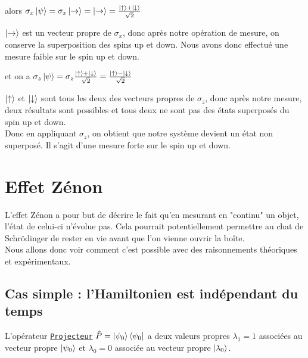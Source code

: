 \documentclass[11pt]{article}
\begin{document}
\begin{tabbing}
    alors \( \sigma_x \ket{\psi} = \sigma_x \ket{\rightarrow} = \ket{\rightarrow} = \frac{\ket{\uparrow} + \ket{\downarrow}}{\sqrt{2}} \)
\end{tabbing}
\( \ket{\rightarrow} \) est un vecteur propre de \( \sigma_x \), donc après notre opération de mesure, on conserve la superposition des spins up et down. Nous avons donc effectué une mesure faible sur le spin up et down.
\begin{tabbing}
    et on a \( \sigma_z \ket{\psi} = \sigma_z \frac{\ket{\uparrow} + \ket{\downarrow}}{\sqrt{2}} = \frac{\ket{\uparrow} - \ket{\downarrow}}{\sqrt{2}} \) 
\end{tabbing}

\( \ket{\uparrow} \) et \( \ket{\downarrow} \) sont tous les deux des vecteurs propres de \( \sigma_z \), donc après notre mesure, deux résultats sont possibles et tous deux ne sont pas des états superposés du spin up et down.
\\Donc en appliquant \( \sigma_z \), on obtient que notre système devient un état non superposé. Il s'agit d'une mesure forte sur le spin up et down.


\newpage

\section{Effet Zénon}
\qquad L'effet Zénon a pour but de décrire le fait qu'en mesurant en "continu" un objet, l'état de celui-ci n'évolue pas. Cela pourrait potentiellement permettre au chat de Schrödinger de rester en vie avant que l'on vienne ouvrir la boîte.\\
\qquad Nous allons donc voir comment c'est possible avec des raisonnements théoriques et expérimentaux.

\subsection{Cas simple : l'Hamiltonien est indépendant du temps}
L'opérateur \hyperref[sec:Projecteur]{\texttt{Projecteur}} $\hat P = \ket{\psi_0}\bra{\psi_0}$ a deux valeurs propres $\lambda_1 = 1$ associées au vecteur propre $\ket{\psi_0}$ et $\lambda_0 = 0$ associée au vecteur propre $\ket{\lambda_0}$.
\end{document}
